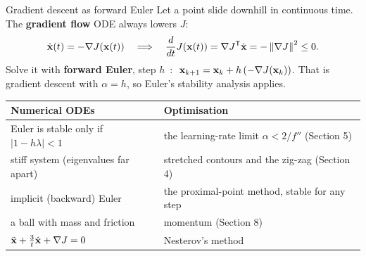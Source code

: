 \begin{frame}{Gradient descent as forward Euler}
  \small
  Let a point slide downhill in continuous time. The \textbf{gradient flow} ODE always lowers $J$:
  \[
    \dot{\mathbf{x}}(t) = -\nabla J(\mathbf{x}(t)) \quad\Longrightarrow\quad \frac{d}{dt}J(\mathbf{x}(t)) = \nabla J^{\mathsf T}\dot{\mathbf{x}} = -\left\lVert \nabla J \right\rVert^2 \le 0 .
  \]
  Solve it with \textbf{forward Euler}, step $h$~\cite{chapra}: $\;\mathbf{x}_{k+1} = \mathbf{x}_k + h\,(-\nabla J(\mathbf{x}_k))$.
  That is \alert{gradient descent with $\alpha = h$}, so Euler's stability analysis applies.

  \vspace{3pt}
  \centering\footnotesize
  \begin{tabular}{@{}l l@{}}
    \toprule
    Numerical ODEs & Optimisation \\
    \midrule
    Euler is stable only if $|1 - h\lambda| < 1$ & the learning-rate limit $\alpha < 2/f''$ (Section 5) \\
    stiff system (eigenvalues far apart) & stretched contours and the zig-zag (Section 4) \\
    implicit (backward) Euler & the proximal-point method, stable for any step \\
    a ball with mass and friction & momentum (Section 8) \\
    $\ddot{\mathbf{x}} + \tfrac3t\dot{\mathbf{x}} + \nabla J = 0$ & Nesterov's method~\cite{su2016} \\
    \bottomrule
  \end{tabular}
\end{frame}



